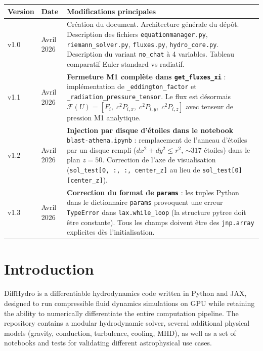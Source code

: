 \documentclass[a4paper, 11pt]{article}
\begin{document}
\begin{center}
\begin{tabular}{|l|l|p{9cm}|}
\hline
\textbf{Version} & \textbf{Date} & \textbf{Modifications principales} \\
\hline
v1.0 & Avril 2026 &
Création du document. Architecture générale du dépôt. Description des fichiers \texttt{equationmanager.py}, \texttt{riemann\_solver.py}, \texttt{fluxes.py}, \texttt{hydro\_core.py}. Description du variant \texttt{no\_chat} à 4 variables. Tableau comparatif Euler standard vs radiatif. \\
\hline
v1.1 & Avril 2026 &
\textbf{Fermeture M1 complète dans \texttt{get\_fluxes\_xi}} : implémentation de \texttt{\_eddington\_factor} et \texttt{\_radiation\_pressure\_tensor}. Le flux est désormais $\mathcal{F}(U) = [F_i,\; c^2 P_{i,x},\; c^2 P_{i,y},\; c^2 P_{i,z}]$ avec tenseur de pression M1 analytique. \\
\hline
v1.2 & Avril 2026 &
\textbf{Injection par disque d'étoiles dans le notebook} \texttt{blast-athena.ipynb} : remplacement de l'anneau d'étoiles par un disque rempli ($dx^2+dy^2 \leq r^2$, $\sim 317$ étoiles) dans le plan $z=50$. Correction de l'axe de visualisation (\texttt{sol\_test[0, :, :, center\_z]} au lieu de \texttt{sol\_test[0][center\_z]}). \\
\hline
v1.3 & Avril 2026 &
\textbf{Correction du format de \texttt{params}} : les tuples Python dans le dictionnaire \texttt{params} provoquent une erreur \texttt{TypeError} dans \texttt{lax.while\_loop} (la structure pytree doit être constante). Tous les champs doivent être des \texttt{jnp.array} explicites dès l'initialisation. \\
\hline
\end{tabular}
\end{center}

\newpage

\section{Introduction}

DiffHydro is a differentiable hydrodynamics code written in Python and JAX, designed to run compressible fluid dynamics simulations on GPU while retaining the ability to numerically differentiate the entire computation pipeline. The repository contains a modular hydrodynamic solver, several additional physical models (gravity, conduction, turbulence, cooling, MHD), as well as a set of notebooks and tests for validating different astrophysical use cases.
\end{document}
